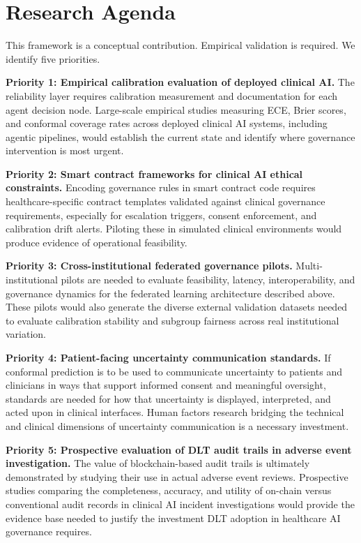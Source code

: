 \documentclass[12pt,a4paper]{article}
\begin{document}
\section*{Research Agenda}

This framework is a conceptual contribution. Empirical validation
is required. We identify five priorities.

\textbf{Priority 1: Empirical calibration evaluation of deployed
clinical AI.}
The reliability layer requires calibration measurement and
documentation for each agent decision node. Large-scale empirical
studies measuring ECE, Brier scores, and conformal coverage rates
across deployed clinical AI systems, including agentic pipelines,
would establish the current state and identify where governance
intervention is most urgent.

\textbf{Priority 2: Smart contract frameworks for clinical AI
ethical constraints.}
Encoding governance rules in smart contract code requires
healthcare-specific contract templates validated against clinical
governance requirements, especially for escalation triggers,
consent enforcement, and calibration drift alerts. Piloting these
in simulated clinical environments would produce evidence of
operational feasibility.

\textbf{Priority 3: Cross-institutional federated governance
pilots.}
Multi-institutional pilots are needed to evaluate feasibility,
latency, interoperability, and governance dynamics for the
federated learning architecture described above. These pilots
would also generate the diverse external validation datasets
needed to evaluate calibration stability and subgroup fairness
across real institutional variation.

\textbf{Priority 4: Patient-facing uncertainty communication
standards.}
If conformal prediction is to be used to communicate uncertainty
to patients and clinicians in ways that support informed consent
and meaningful oversight, standards are needed for how that
uncertainty is displayed, interpreted, and acted upon in clinical
interfaces. Human factors research bridging the technical and
clinical dimensions of uncertainty communication is a necessary
investment.

\textbf{Priority 5: Prospective evaluation of DLT audit trails
in adverse event investigation.}
The value of blockchain-based audit trails is ultimately
demonstrated by studying their use in actual adverse event
reviews. Prospective studies comparing the completeness,
accuracy, and utility of on-chain versus conventional audit
records in clinical AI incident investigations would provide the
evidence base needed to justify the investment DLT adoption in
healthcare AI governance requires.
\end{document}
